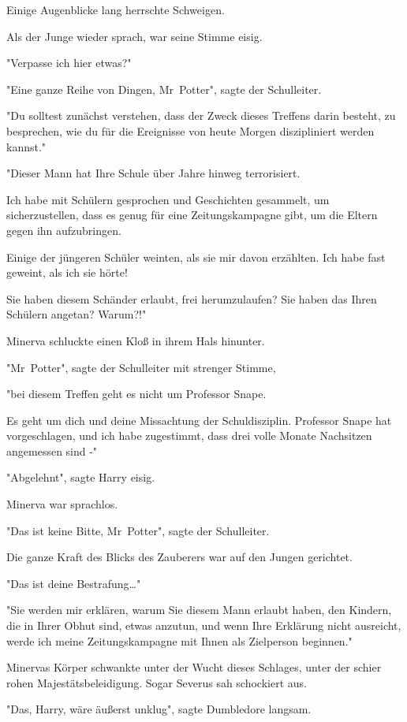 {Einige Augenblicke lang herrschte Schweigen.

Als der Junge wieder sprach, war seine Stimme eisig.

"Verpasse ich hier etwas?"

"Eine ganze Reihe von Dingen, Mr~Potter", sagte der Schulleiter.

"Du solltest zunächst verstehen, dass der Zweck dieses Treffens darin besteht, zu besprechen, wie du für die Ereignisse von heute Morgen diszipliniert werden kannst."

"Dieser Mann hat Ihre Schule über Jahre hinweg terrorisiert.

Ich habe mit Schülern gesprochen und Geschichten gesammelt, um sicherzustellen, dass es genug für eine Zeitungskampagne gibt, um die Eltern gegen ihn aufzubringen.

Einige der jüngeren Schüler weinten, als sie mir davon erzählten. Ich habe fast geweint, als ich sie hörte!

Sie haben diesem Schänder erlaubt, frei herumzulaufen? Sie haben das Ihren Schülern angetan? Warum?!"

Minerva schluckte einen Kloß in ihrem Hals hinunter.

"Mr~Potter", sagte der Schulleiter mit strenger Stimme,

"bei diesem Treffen geht es nicht um Professor Snape.

Es geht um dich und deine Missachtung der Schuldisziplin. Professor Snape hat vorgeschlagen, und ich habe zugestimmt, dass drei volle Monate Nachsitzen angemessen sind -"

"Abgelehnt", sagte Harry eisig.

Minerva war sprachlos.

"Das ist keine Bitte, Mr~Potter", sagte der Schulleiter.

Die ganze Kraft des Blicks des Zauberers war auf den Jungen gerichtet.

"Das ist deine Bestrafung…"

"Sie werden mir erklären, warum Sie diesem Mann erlaubt haben, den Kindern, die in Ihrer Obhut sind, etwas anzutun, und wenn Ihre Erklärung nicht ausreicht, werde ich meine Zeitungskampagne mit Ihnen als Zielperson beginnen."

Minervas Körper schwankte unter der Wucht dieses Schlages, unter der schier rohen Majestätsbeleidigung. Sogar Severus sah schockiert aus.

"Das, Harry, wäre äußerst unklug", sagte Dumbledore langsam.

}
